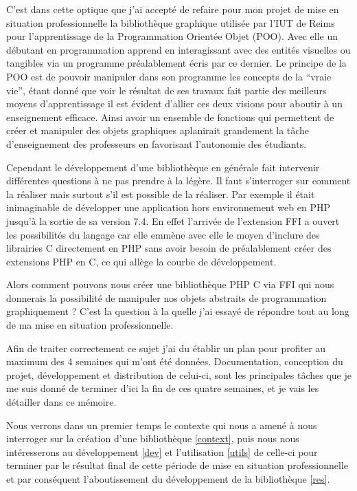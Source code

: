 \documentclass[11pt,a4paper,krantz2,11pt,oneside]{krantz}
\begin{document}
C'est dans cette optique que j'ai accepté de refaire pour mon projet de mise en situation professionnelle la bibliothèque graphique utilisée par l'IUT de Reims pour l'apprentissage de la Programmation Orientée Objet (POO). Avec elle un débutant en programmation apprend en interagissant avec des entités visuelles ou tangibles via un programme préalablement écris par ce dernier. Le principe de la POO est de pouvoir manipuler dans son programme les concepts de la ``vraie vie'', étant donné que voir le résultat de ses travaux fait partie des meilleurs moyens d'apprentissage il est évident d'allier ces deux visions pour aboutir à un enseignement efficace. Ainsi avoir un ensemble de fonctions qui permettent de créer et manipuler des objets graphiques aplanirait grandement la tâche d'enseignement des professeurs en favorisant l'autonomie des étudiants.

Cependant le développement d'une bibliothèque en générale fait intervenir différentes questions à ne pas prendre à la légère. Il faut s'interroger sur comment la réaliser mais surtout s'il est possible de la réaliser. Par exemple il était inimaginable de développer une application hors environnement web en PHP jusqu'à la sortie de sa version 7.4. En effet l'arrivée de l'extension FFI a ouvert les possibilités du langage car elle emmène avec elle le moyen d'inclure des librairies C directement en PHP sans avoir besoin de préalablement créer des extensions PHP en C, ce qui allège la courbe de développement.

Alors comment pouvons nous créer une bibliothèque PHP C via FFI qui nous donnerais la possibilité de manipuler nos objets abstraits de programmation graphiquement ? C'est la question à la quelle j'ai essayé de répondre tout au long de ma mise en situation professionnelle.

Afin de traiter correctement ce sujet j'ai du établir un plan pour profiter au maximum des 4 semaines qui m'ont été données. Documentation, conception du projet, développement et distribution de celui-ci, sont les principales tâches que je me suis donné de terminer d'ici la fin de ces quatre semaines, et je vais les détailler dans ce mémoire.

Nous verrons dans un premier temps le contexte qui nous a amené à nous interroger sur la création d'une bibliothèque \ref{context}, puis nous nous intéresserons au développement \ref{dev} et l'utilisation \ref{utils} de celle-ci pour terminer par le résultat final de cette période de mise en situation professionnelle et par conséquent l'aboutissement du développement de la bibliothèque \ref{res}.
\end{document}
